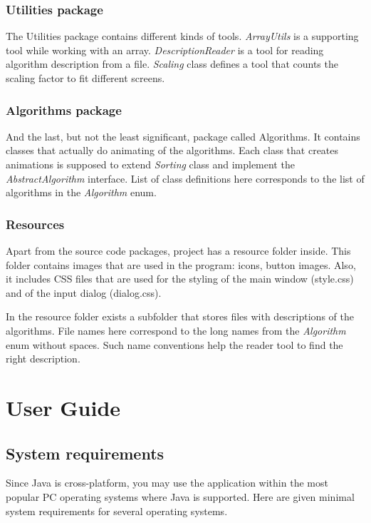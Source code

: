 \documentclass[
  field=inf,
  biblatex,
  language=english,
  glossaries,
  theorems=false,
  sourcecodes=false,
  index
]{kidiplom}
\begin{document}
\subsubsection{Utilities package}
The Utilities package contains different kinds of tools. \textit{ArrayUtils} is a supporting tool while working with an array. \textit{DescriptionReader} is a tool for reading algorithm description from a file. \textit{Scaling} class defines a tool that counts the scaling factor to fit different screens.

\subsubsection{Algorithms package}
And the last, but not the least significant, package called Algorithms. It contains classes that actually do animating of the algorithms. Each class that creates animations is supposed to extend \textit{Sorting} class and implement the \textit{AbstractAlgorithm} interface. List of class definitions here corresponds to the list of algorithms in the \textit{Algorithm} enum.

\subsubsection{Resources}
Apart from the source code packages, project has a resource folder inside. This folder contains images that are used in the program: icons, button images. Also, it includes \Gls{CSS} files that are used for the styling of the main window (style.css) and of the input dialog (dialog.css).

In the resource folder exists a subfolder that stores files with descriptions of the algorithms. File names here correspond to the long names from the \textit{Algorithm} enum without spaces. Such name conventions help the reader tool to find the right description.

\newpage
\section{User Guide}

\subsection{System requirements}

Since Java is cross-platform, you may use the application within the most popular PC operating systems where Java is supported. Here are given minimal system requirements for several operating systems.
\end{document}
